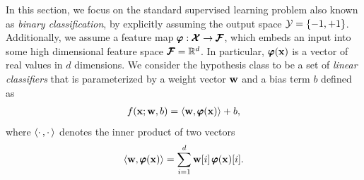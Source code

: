 In this section, we focus on the standard supervised learning problem also known as \textit{binary classification}, by explicitly assuming the output space $\mathcal{Y}=\{-1,+1\}$.
Additionally, we assume a feature map $\pmb \varphi:\pmb {\mathcal{X}}\rightarrow\pmb {\mathcal{F}}$, which embeds an input into some high dimensional feature space $\pmb {\mathcal{F}}=\mathbb{R}^d$.
In particular, $\pmb \varphi(\mathbf {x})$ is a vector of real values in $d$ dimensions.
We consider the hypothesis class to be a set of \textit{linear classifiers} that is parameterized by a weight vector $\mathbf {w}$ and a bias term $b$ defined as
\begin{align}
	f(\mathbf {x};\mathbf {w},b) = \langle \mathbf {w}, \pmb \varphi(\mathbf {x}) \rangle + b, \label{linearclassifier}
\end{align}
where $\langle \cdot\,, \cdot\, \rangle$ denotes the inner product of two vectors
\begin{align*}
	\langle \mathbf {w}, \pmb \varphi(\mathbf {x}) \rangle = \sum_{i=1}^{d}\mathbf {w}[i]\,\pmb \varphi(\mathbf {x})[i].
\end{align*}
